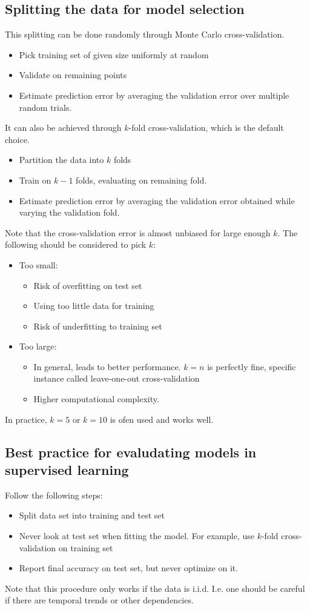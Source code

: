 \documentclass[a4paper,10pt,twoside]{article}
\begin{document}
\subsection{Splitting the data for model selection}
This splitting can be done randomly through Monte Carlo cross-validation. 
\begin{itemize}
    \item Pick training set of given size uniformly at random
    \item Validate on remaining points
    \item Estimate prediction error by averaging the validation error over multiple random trials.
\end{itemize}
It can also be achieved through $k$-fold cross-validation, which is the default choice.
\begin{itemize}
    \item Partition the data into $k$ folds
    \item Train on $k-1$ folds, evaluating on remaining fold.
    \item Estimate prediction error by averaging the validation error obtained while varying the validation fold.
\end{itemize}
Note that the cross-validation error is almost unbiased for large enough $k$. The following should be considered to pick $k$:
\begin{itemize}
    \item Too small: 
    \begin{itemize}
        \item Risk of overfitting on test set
        \item Using too little data for training
        \item Risk of underfitting to training set
    \end{itemize}
    \item Too large:
    \begin{itemize}
        \item In general, leads to better performance. $k=n$ is perfectly fine, specific instance called leave-one-out cross-validation
        \item Higher computational complexity.
    \end{itemize}
\end{itemize} 
In practice, $k=5$ or $k=10$ is ofen used and works well.
\subsection{Best practice for evaludating models in supervised learning}
Follow the following steps:
\begin{itemize}
    \item Split data set into training and test set
    \item Never look at test set when fitting the model. For example, use $k$-fold cross-validation on training set
    \item Report final accuracy on test set, but never optimize on it.
\end{itemize}
Note that this procedure only works if the data is i.i.d. I.e. one should be careful if there are temporal trends or other dependencies.
\end{document}
